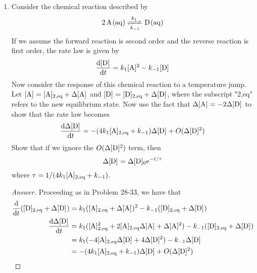 \documentclass[../psets.tex]{subfiles}
\begin{document}
\begin{enumerate}[label={\textbf{28-\arabic*.}},leftmargin=3.5em]
\begin{proof}[Answer]
\begin{align*}
            \ln\frac{\Delta\cnc{P}}{\Delta\cnc[0]{P}} &= -\frac{t}{\tau}\\
            \Delta\cnc{P} &= \Delta\cnc[0]{P}\e[-t/\tau]
        \end{align*}
        where
        \begin{equation*}
            \tau = \frac{1}{k_1(\cnc[2,eq]{A}+\cnc[2,eq]{B})+k_{-1}}
        \end{equation*}
        as desired.
    \end{proof}
    \setcounter{enumi}{35}
    \item Consider the chemical reaction described by
    \begin{equation*}
        \ce{2A(aq) <=>[$k_1$][$k_{-1}$] D(aq)}
    \end{equation*}
    If we assume the forward reaction is second order and the reverse reaction is first order, the rate law is given by
    \begin{equation*}
        \dv{\cnc{D}}{t} = k_1\cnc{A}^2-k_{-1}\cnc{D}
    \end{equation*}
    Now consider the response of this chemical reaction to a temperature jump. Let $\cnc{A}=\cnc[2,eq]{A}+\Delta\cnc{A}$ and $\cnc{D}=\cnc[2,eq]{D}+\Delta\cnc{D}$, where the subscript "2,eq" refers to the new equilibrium state. Now use the fact that $\Delta\cnc{A}=-2\Delta\cnc{D}$ to show that the rate law becomes
    \begin{equation*}
        \dv{\Delta\cnc{D}}{t} = -(4k_1\cnc[2,eq]{A}+k_{-1})\Delta\cnc{D}+O(\Delta\cnc{D}^2)
    \end{equation*}
    Show that if we ignore the $O(\Delta\cnc{D}^2)$ term, then
    \begin{equation*}
        \Delta\cnc{D} = \Delta\cnc[0]{D}\e[-t/\tau]
    \end{equation*}
    where $\tau=1/(4k_1\cnc[2,eq]{A}+k_{-1})$.
    \begin{proof}[Answer]
        Proceeding as in Problem 28-33, we have that
        \begin{align*}
            \dv{t}(\cnc[2,eq]{D}+\Delta\cnc{D}) &= k_1(\cnc[2,eq]{A}+\Delta\cnc{A})^2-k_{-1}(\cnc[2,eq]{D}+\Delta\cnc{D})\\
            \dv{\Delta\cnc{D}}{t} &= k_1(\cnc[2,eq]{A}^2+2\cnc[2,eq]{A}\Delta\cnc{A}+\Delta\cnc{A}^2)-k_{-1}(\cnc[2,eq]{D}+\Delta\cnc{D})\\
            &= k_1(-4\cnc[2,eq]{A}\Delta\cnc{D}+4\Delta\cnc{D}^2)-k_{-1}\Delta\cnc{D}\\
            &= -(4k_1\cnc[2,eq]{A}+k_{-1})\Delta\cnc{D}+O(\Delta\cnc{D}^2)

\end{align*}
\end{proof}
\end{enumerate}
\end{document}
